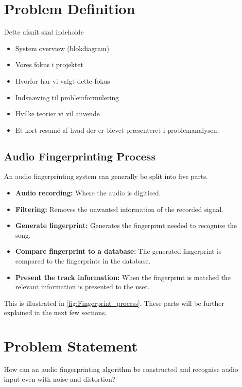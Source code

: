 

\section{Problem Definition}
Dette afsnit skal indeholde
\begin{itemize}
    \item System overview (blokdiagram)
    \item Vores fokus i projektet
    \item Hvorfor har vi valgt dette fokus
    \item Indsnæving til problemformulering
    \item Hvilke teorier vi vil anvende
    \item Et kort resumé af hvad der er blevet præsenteret i problemanalysen. 
\end{itemize}
\subsection{Audio Fingerprinting Process}
An audio fingerprinting system can generally be split into five parts.
\begin{itemize}
    \item \textbf{Audio recording:} Where the audio is digitised.
    \item \textbf{Filtering:} Removes the unwanted information of the recorded signal.
    \item \textbf{Generate fingerprint:} Generates the fingerprint needed to recognise the song.
    \item \textbf{Compare fingerprint to a database:} The generated fingerprint is compared to the fingerprints in the database.
    \item \textbf{Present the track information:} When the fingerprint is matched the relevant information is presented to the user.
\end{itemize}
This is illustrated in \autoref{fig:Fingerprint_process}.
These parts will be further explained in the next few sections.
   


\section{Problem Statement}
How can an audio fingerprinting algorithm be constructed and recognise audio input even with noise and distortion? 

